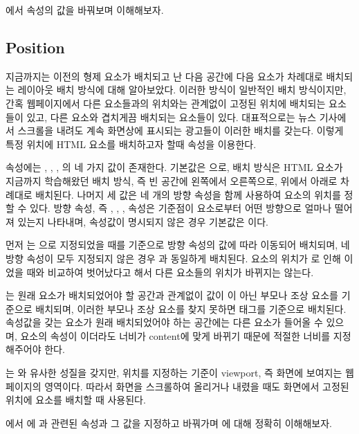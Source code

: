 에서  속성의 값을 바꿔보며 이해해보자.

\subsection*{Position}

지금까지는 이전의 형제 요소가 배치되고 난 다음 공간에 다음 요소가 차례대로 배치되는 레이아웃 배치 방식에 대해 알아보았다. 이러한 방식이 일반적인 배치 방식이지만, 간혹 웹페이지에서 다른 요소들과의 위치와는 관계없이 고정된 위치에 배치되는 요소들이 있고, 다른 요소와 겹치게끔 배치되는 요소들이 있다. 대표적으로는 뉴스 기사에서 스크롤을 내려도 계속 화면상에 표시되는 광고들이 이러한 배치를 갖는다. 이렇게 특정 위치에 HTML 요소를 배치하고자 할때  속성을 이용한다.

 속성에는 , , , 의 네 가지 값이 존재한다. 기본값은 으로,  배치 방식은 HTML 요소가 지금까지 학습해왔던 배치 방식, 즉 빈 공간에 왼쪽에서 오른쪽으로, 위에서 아래로 차례대로 배치된다. 나머지 세 값은 네 개의 방향 속성을 함께 사용하여 요소의 위치를 정할 수 있다. 방향 속성, 즉 , , ,  속성은 기준점이 요소로부터 어떤 방향으로 얼마나 떨어져 있는지 나타내며, 속성값이 명시되지 않은 경우 기본값은 이다.

먼저 는 으로 지정되었을 때를 기준으로 방향 속성의 값에 따라 이동되어 배치되며, 네 방향 속성이 모두 지정되지 않은 경우 과 동일하게 배치된다. 요소의 위치가 로 인해 이었을 때와 비교하여 벗어났다고 해서 다른 요소들의 위치가 바뀌지는 않는다.

는 원래 요소가 배치되었어야 할 공간과 관계없이  값이 이 아닌 부모나 조상 요소를 기준으로 배치되며, 이러한 부모나 조상 요소를 찾지 못하면  태그를 기준으로 배치된다.  속성값을 갖는 요소가 원래 배치되었어야 하는 공간에는 다른 요소가 들어올 수 있으며, 요소의  속성이 이더라도 너비가 content에 맞게 바뀌기 때문에 적절한 너비를 지정해주어야 한다.

는 와 유사한 성질을 갖지만, 위치를 지정하는 기준이 viewport, 즉 화면에 보여지는 웹페이지의 영역이다. 따라서 화면을 스크롤하여 올리거나 내렸을 때도 화면에서 고정된 위치에 요소를 배치할 때 사용된다.

에서 에 과 관련된 속성과 그 값을 지정하고 바꿔가며 에 대해 정확히 이해해보자.

